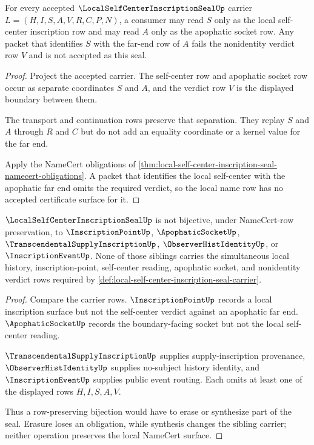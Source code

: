 \begin{theorem}
\label{thm:local-self-center-inscription-seal-nonidentity-boundary}
For every accepted $\LocalSelfCenterInscriptionSealUp$ carrier $L=(H,I,S,A,V,R,C,P,N)$, a consumer may read $S$ only as the local self-center inscription row and may read $A$ only as the apophatic socket row. Any packet that identifies $S$ with the far-end row of $A$ fails the nonidentity verdict row $V$ and is not accepted as this seal.
\end{theorem}
\begin{proof}
Project the accepted carrier. The self-center row and apophatic socket row occur as separate coordinates $S$ and $A$, and the verdict row $V$ is the displayed boundary between them.

The transport and continuation rows preserve that separation. They replay $S$ and $A$ through $R$ and $C$ but do not add an equality coordinate or a kernel value for the far end.

Apply the NameCert obligations of \autoref{thm:local-self-center-inscription-seal-namecert-obligations}. A packet that identifies the local self-center with the apophatic far end omits the required verdict, so the local name row has no accepted certificate surface for it.
\end{proof}

\begin{theorem}
\label{thm:local-self-center-inscription-seal-sibling-separation}
$\LocalSelfCenterInscriptionSealUp$ is not bijective, under NameCert-row preservation, to $\InscriptionPointUp$, $\ApophaticSocketUp$, $\TranscendentalSupplyInscriptionUp$, $\ObserverHistIdentityUp$, or $\InscriptionEventUp$. None of those siblings carries the simultaneous local history, inscription-point, self-center reading, apophatic socket, and nonidentity verdict rows required by \autoref{def:local-self-center-inscription-seal-carrier}.
\end{theorem}
\begin{proof}
Compare the carrier rows. $\InscriptionPointUp$ records a local inscription surface but not the self-center verdict against an apophatic far end. $\ApophaticSocketUp$ records the boundary-facing socket but not the local self-center reading.

$\TranscendentalSupplyInscriptionUp$ supplies supply-inscription provenance, $\ObserverHistIdentityUp$ supplies no-subject history identity, and $\InscriptionEventUp$ supplies public event routing. Each omits at least one of the displayed rows $H,I,S,A,V$.

Thus a row-preserving bijection would have to erase or synthesize part of the seal. Erasure loses an obligation, while synthesis changes the sibling carrier; neither operation preserves the local NameCert surface.
\end{proof}

